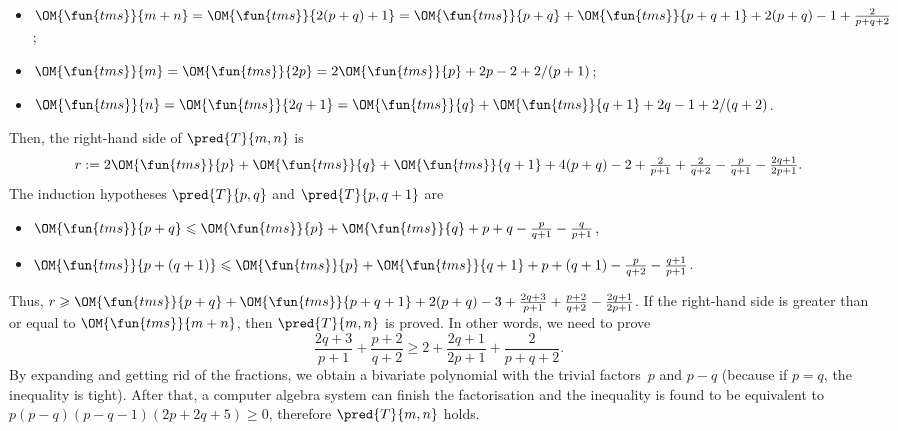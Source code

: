 \begin{enumerate}
\begin{itemize}
      \item \(\OM{\fun{tms}}{m+n} = \OM{\fun{tms}}{2(p+q)+1} =
        \OM{\fun{tms}}{p+q} + \OM{\fun{tms}}{p+q+1} + 2(p+q) - 1 +
        \tfrac{2}{p+q+2}\);

      \item \(\OM{\fun{tms}}{m} = \OM{\fun{tms}}{2p} =
        2\OM{\fun{tms}}{p} + 2p - 2 + 2/(p+1)\);

      \item \(\OM{\fun{tms}}{n} = \OM{\fun{tms}}{2q+1} =
        \OM{\fun{tms}}{q} + \OM{\fun{tms}}{q+1} + 2q - 1 + 2/(q+2)\).

    \end{itemize}
    Then, the right\hyp{}hand side of \(\pred{T}{m,n}\) is
    \begin{equation*}
      r := 2\OM{\fun{tms}}{p} + \OM{\fun{tms}}{q} +
      \OM{\fun{tms}}{q+1} + 4(p+q) - 2 + \tfrac{2}{p+1} +
      \tfrac{2}{q+2} - \tfrac{p}{q+1} - \tfrac{2q+1}{2p+1}.
    \end{equation*}
    The induction hypotheses \(\pred{T}{p,q}\) and \(\pred{T}{p,q+1}\)
    are
    \begin{itemize}

      \item \(\OM{\fun{tms}}{p+q} \leqslant \OM{\fun{tms}}{p} +
      \OM{\fun{tms}}{q} + p + q - \frac{p}{q+1} - \frac{q}{p+1}\),

      \item \(\OM{\fun{tms}}{p+(q+1)} \leqslant \OM{\fun{tms}}{p} +
      \OM{\fun{tms}}{q+1} + p + (q + 1) - \frac{p}{q+2} -
      \frac{q+1}{p+1}\).

    \end{itemize}
    Thus, \(r \geqslant \OM{\fun{tms}}{p+q} + \OM{\fun{tms}}{p+q+1} +
    2(p+q) - 3 + \tfrac{2q+3}{p+1} + \tfrac{p+2}{q+2} -
    \tfrac{2q+1}{2p+1}\). If the right\hyp{}hand side is greater than
    or equal to \(\OM{\fun{tms}}{m+n}\), then \(\pred{T}{m,n}\) is
    proved. In other words, we need to prove
    \begin{equation*}
      \frac{2q+3}{p+1} + \frac{p+2}{q+2} \geqslant 2 +
      \frac{2q+1}{2p+1} + \frac{2}{p+q+2}.
    \end{equation*}
    By expanding and getting rid of the fractions, we obtain a
    bivariate polynomial with the trivial factors~\(p\) and \(p-q\)
    (because if \(p=q\), the inequality is tight). After that, a
    computer algebra system can finish the factorisation and the
    inequality is found to be equivalent to \(p(p-q)(p-q-1)(2p+2q+5)
    \geqslant 0\), therefore \(\pred{T}{m,n}\) holds.


\end{enumerate}
